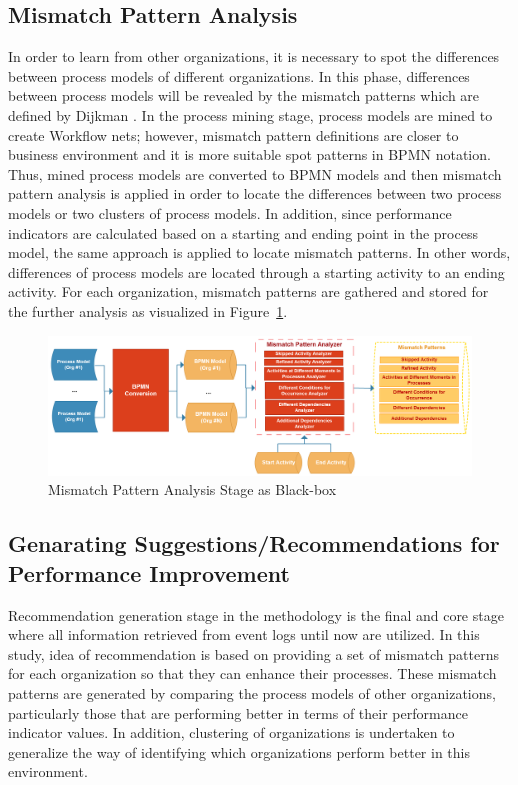 \subsection{Mismatch Pattern Analysis}
\label{subsec:mismatch-pattern-analysis}
In order to learn from other organizations, it is necessary to spot the differences between process models of different organizations. In this phase, differences between process models will be revealed by the mismatch patterns which are defined by Dijkman \cite{dijkman2007mismatch}. In the process mining stage, process models are mined to create Workflow nets; however, mismatch pattern definitions are closer to business environment and it is more suitable spot patterns in BPMN notation. Thus, mined process models are converted to BPMN models and then mismatch pattern analysis is applied in order to locate the differences between two process models or two clusters of process models. In addition, since performance indicators are calculated based on a starting and ending point in the process model, the same approach is applied to locate mismatch patterns. In other words, differences of process models are located through a starting activity to an ending activity. For each organization, mismatch patterns are gathered and stored for the further analysis as visualized in Figure~\ref{fig:mismatch-pattern-analysis-blackbox}.
\begin{figure}
  \centering
  \includegraphics[width=\textwidth]{4_methodology/mismatch-pattern-analysis-blackbox}
  \caption{Mismatch Pattern Analysis Stage as Black-box}
  \label{fig:mismatch-pattern-analysis-blackbox}
\end{figure}

\subsection{Genarating Suggestions/Recommendations for Performance Improvement}
\label{subsec:recommendation-generation}
Recommendation generation stage in the methodology is the final and core stage where all information retrieved from event logs until now are utilized. In this study, idea of recommendation is based on providing a set of mismatch patterns for each organization so that they can enhance their processes. These mismatch patterns are generated by comparing the process models of other organizations, particularly those that are performing better in terms of their performance indicator values. In addition, clustering of organizations is undertaken to generalize the way of identifying which organizations perform better in this environment.

